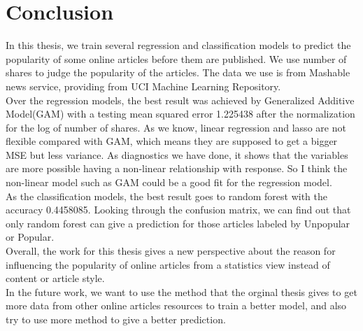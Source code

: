 \documentclass[12pt]{article}
\begin{document}
\clearpage
\section{Conclusion}
In this thesis, we train several regression and classification models to predict the popularity of some online articles before them are published. We use number of shares to judge the popularity of the articles. The data we use is from Mashable news service, providing from UCI Machine Learning Repository.  \\
Over the regression models, the best result was achieved by Generalized Additive Model(GAM) with a testing mean squared error 1.225438 after the normalization for the log of number of shares. As we know, linear regression and lasso are not flexible compared with GAM, which means they are supposed to get a bigger MSE but less variance. As diagnostics we have done, it shows that the variables are more possible having a non-linear relationship with response. So I think the non-linear model such as GAM could be a good fit for the regression model. \\
As the classification models, the best result goes to random forest with the accuracy 0.4458085. Looking through the confusion matrix, we can find out that only random forest can give a prediction for those articles labeled by Unpopular or Popular.\\
Overall, the work for this thesis gives a new perspective about the reason for influencing the popularity of online articles from a statistics view instead of content or article style. \\
In the future work, we want to use the method that the orginal thesis gives to get more data from other online articles resources to train a better model, and also try to use more method to give a better prediction.

\clearpage
\end{document}
